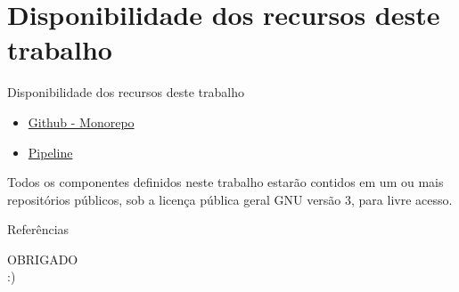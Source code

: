\documentclass[10pt,brazil]{beamer}
\theoremstyle{definition}
\begin{document}
\section{Disponibilidade dos recursos deste trabalho}

\begin{frame}{Disponibilidade dos recursos deste trabalho}
  \begin{itemize}
    \item \href{https://github.com/felipefrocha/esufmg-tcc}{Github - Monorepo}
    \item \href{https://github.com/felipefrocha/esufmg-tcc/actions}{Pipeline}
  \end{itemize}
  Todos os componentes definidos neste trabalho estarão contidos em um ou mais repositórios públicos, sob a licença pública geral GNU versão 3, para livre acesso.
  
\end{frame}

\begin{frame}[allowframebreaks]{Referências}
  \small
  
\end{frame}


\begin{frame}
  \centering
  {\color{ros} OBRIGADO\\
    :)}
\end{frame}
\end{document}
